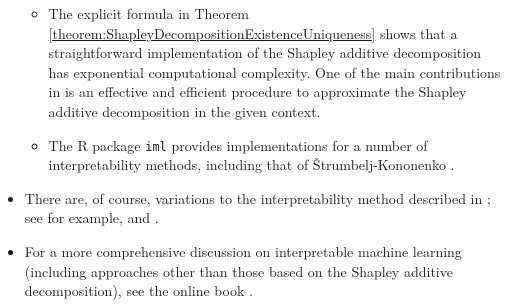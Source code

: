 \begin{itemize}
\begin{itemize}
	\item
		The explicit formula in
		Theorem \ref{theorem:ShapleyDecompositionExistenceUniqueness}
		shows that a straightforward implementation of the Shapley additive decomposition
		has exponential computational complexity.
		One of the main contributions in \cite{Strumbelj2010} is
		an effective and efficient procedure to approximate
		the Shapley additive decomposition in the given context.

	\item
		The {\color{red}R package} 
		\texttt{iml} \cite{Molnar2018} %
		provides implementations for a number of interpretability methods,
		including that of \v{S}trumbelj-Kononenko \cite{Strumbelj2010}.

	\end{itemize}

\item
	There are, of course, variations to the interpretability method described in \cite{Strumbelj2010};
	see for example, \cite{Lipovestsky2001} and \cite{Lundberg2017}. 

\item
	For a more comprehensive discussion on interpretable machine learning
	(including approaches other than those based on the Shapley additive decomposition),
	see the {\color{red}online book} \cite{Molnar2019}.

\end{itemize}


\renewcommand{\theenumi}{\roman{enumi}}
\renewcommand{\labelenumi}{\textnormal{(\theenumi)}$\;\;$}

